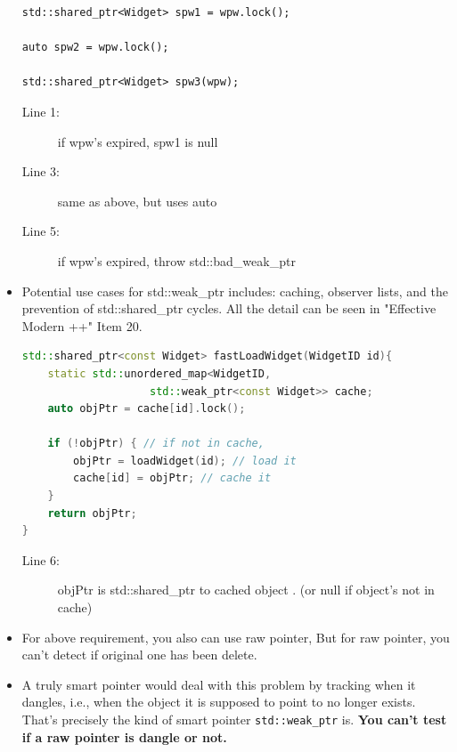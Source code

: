 \documentclass[a4paper,11pt,twoside]{book}
\begin{document}
\begin{itemize}
\begin{lstlisting}
std::shared_ptr<Widget> spw1 = wpw.lock();

auto spw2 = wpw.lock();

std::shared_ptr<Widget> spw3(wpw);
\end{lstlisting}
\begin{description}
	\item[Line 1:] if wpw's expired, spw1 is null
	\item[Line 3:] same as above, but uses auto
	\item[Line 5:] if wpw's expired, throw std::bad\_weak\_ptr
\end{description}


\item Potential use cases for std::weak\_ptr includes: caching, observer lists, and the prevention of std::shared\_ptr cycles.  All the detail can be seen in "Effective Modern ++" Item 20.
\begin{lstlisting}[frame=single, language=c++]
std::shared_ptr<const Widget> fastLoadWidget(WidgetID id){
	static std::unordered_map<WidgetID, 
	                std::weak_ptr<const Widget>> cache;
	auto objPtr = cache[id].lock();

	if (!objPtr) { // if not in cache,
		objPtr = loadWidget(id); // load it
		cache[id] = objPtr; // cache it
	}
	return objPtr;
}
\end{lstlisting}
\begin{description}
	\item[Line 6:] objPtr is std::shared\_ptr to cached object . (or null if object's not in cache)
\end{description}


\item For above requirement, you also can use raw pointer, But for raw pointer, you can't detect if original one has been delete. 

\item A truly smart pointer would deal with this problem by tracking
when it dangles, i.e., when the object it is supposed to point to no longer exists. That's precisely the kind of smart pointer \texttt{std::weak\_ptr} is. \textbf{You can't test if a raw pointer is dangle or not.}
\end{itemize}
\end{document}
